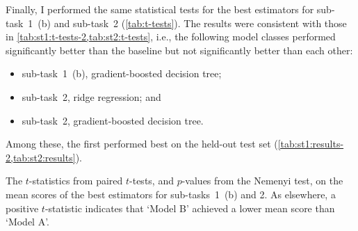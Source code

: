 Finally, I performed the same statistical tests for the best estimators for
sub-task~1~(b) and sub-task~2 (\cref{tab:t-tests}).
The results were consistent with those in
\cref{tab:st1:t-tests-2,tab:st2:t-tests}, i.e., the following model classes
performed significantly better than the baseline but not significantly better than
each other:
\begin{itemize}
  \item sub-task~1~(b), gradient-boosted decision tree;
  \item sub-task~2, ridge regression; and
  \item sub-task~2, gradient-boosted decision tree.
\end{itemize}
Among these, the first performed best on the held-out test set
(\cref{tab:st1:results-2,tab:st2:results}).

\begin{landscape}
  \begin{table}
    \centering
    \caption{The $t$-statistics from paired $t$-tests, and $p$-values from the Nemenyi test, on the
      mean scores of the best estimators for sub-tasks~1~(b) and 2.
      As elsewhere, a positive $t$-statistic indicates that `Model B' achieved a lower mean
      score than `Model A'.
    }
    \label{tab:t-tests}
  \end{table}
\end{landscape}
